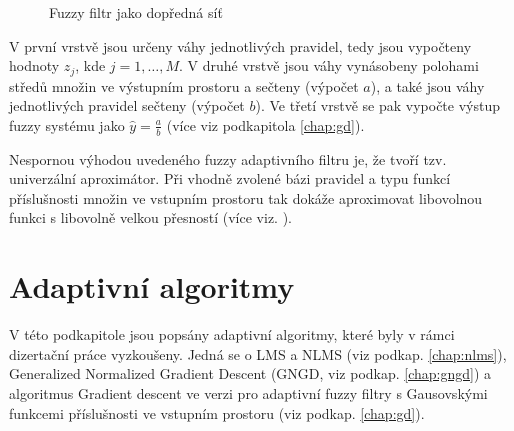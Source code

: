 \begin{figure}[t]
    \caption{Fuzzy filtr jako dopředná síť}
    \label{img:fuzzy_network}
\end{figure}

V první vrstvě jsou určeny váhy jednotlivých pravidel, tedy jsou vypočteny hodnoty $z_j$, kde $j=1,\dots, M$. V druhé vrstvě jsou váhy vynásobeny polohami středů množin ve výstupním prostoru a sečteny (výpočet $a$), a také jsou váhy jednotlivých pravidel sečteny (výpočet $b$). Ve třetí vrstvě se pak vypočte výstup fuzzy systému jako $\hat{y}=\frac{a}{b}$ (více viz podkapitola \ref{chap:gd}). 
\par Nespornou výhodou uvedeného fuzzy adaptivního filtru je, že tvoří tzv. univerzální aproximátor. Při vhodně zvolené bázi pravidel a typu funkcí příslušnosti množin ve vstupním prostoru tak dokáže aproximovat libovolnou funkci s libovolně velkou přesností (více viz. \cite{fuzzywang}).


\section{Adaptivní algoritmy}\label{chap:aa}
V této podkapitole jsou popsány adaptivní algoritmy, které byly v rámci dizertační práce vyzkoušeny. Jedná se o LMS a NLMS (viz podkap. \ref{chap:nlms}), Generalized Normalized Gradient Descent (GNGD, viz podkap. \ref{chap:gngd}) a algoritmus Gradient descent ve verzi pro adaptivní fuzzy filtry s Gausovskými funkcemi příslušnosti ve vstupním prostoru (viz podkap. \ref{chap:gd}).
